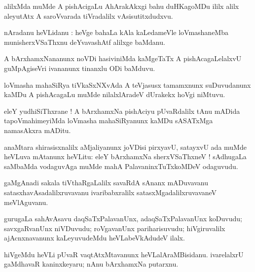 \documentclass{article}
\begin{document}
\begin{mn}
alilxMda muMde A pishAcigaLu AhArakAkxgi bahu duHKagoMDu ililx alilx aleyutAtx A saroVvarada 
tiVradalilx vAsisutitxdudxvu.
\end{mn}


\begin{mn}
nAradanu heVLidanu : heVge bahaLa kAla kaLedameVle loVmashaneMba munisherxVSaThxnu deYvavashAtf 
alilxge baMdanu.
\end{mn}

\begin{mn}
A bArxhamxNananunx noVDi hasiviniMda kaMgeTaTx A pishAcagaLelalxvU guMpAgiseVri ivananunx tinanxlu 
ODi baMduvu.
\end{mn}

\begin{mn}
loVmasha mahaSiRya tiVkaSxNXvAda A teVjasusx tamamxnunx suDuvudanunx kaMDu A pishAcagaLu muMde
nilalxlAradeV dUrakekx hoVgi niMtuvu.
\end{mn}

\begin{mn}
eleY yudhiSiThxrane ! A bArxhamxNa pishAciyu pUvaRdalilx tAnu mADida tapoVmahimeyiMda loVmasha 
mahaSiRyanunx kaMDu sASATxMga namasAkxra mADitu.
\end{mn}

\begin{mn}
anaMtara shirasisxnalilx aMjaliyanunx joVDisi pirxyavU, satayxvU ada muMde heVLuva mAtanunx heVLitu:
eleY bArxhamxNa sherxVSaThxneV ! sAdhugaLa saMbaMda vodaguvAga muMde mahA PalavaninxTuTxkoMDeV
odaguvudu.
\end{mn}

\begin{mn}
gaMgAnadi sakala tiVthaRgaLalilx  savaRdA sAnanx mADuvavanu satasxhavAsadalilxruvavanu 
ivaribabxralilx  satasxMgadalilxruvavaneV meVlAguvanu.
\end{mn}

\begin{mn}
gurugaLa sahAvAsavu daqSaTxPalavanUnx, adaqSaTxPalavanUnx koDuvudu; savxgaRvanUnx  niVDuvudu; 
roVgavanUnx pariharisuvudu; hiVgiruvalilx  ajAcnxnavanunx kaLeyuvudeMdu heVLabeVkAdudeV ilalx.
\end{mn}

\begin{mn}
hiVgeMdu heVLi pUvaR vaqtAtxMtavanunx heVLalAraMBisidanu. ivarelalxrU gaMdhavaR kaninxkeyaru; nAnu 
bArxhamxNa putarxnu.
\end{mn}
\end{document}
